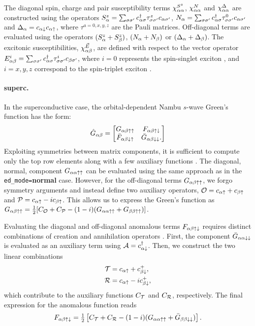 \documentclass[edipack_sp.tex]{subfiles}
\begin{document}
The diagonal spin, charge and pair susceptibility terms
$\chi^{S^z}_{\alpha\alpha}$, $\chi^N_{\alpha\alpha}$ and $\chi^\Delta_{\alpha\alpha}$
are constructed using the operators $S^z_\alpha = \sum_{\sigma\sigma'} c^\dagger_{\alpha\sigma}
\tau^z_{\sigma\sigma'} c_{\alpha\sigma'}$, 
$N_\alpha = \sum_{\sigma\sigma'} c^\dagger_{\alpha\sigma} \tau^0_{\sigma\sigma'} c_{\alpha\sigma'}$
and $\Delta_\alpha = c_{\alpha\downarrow}c_{\alpha\uparrow}$,
where $\tau^{a=0,x,y,z}$ are the Pauli matrices.
Off-diagonal terms are  evaluated using the operators
$(S^z_\alpha + S^z_\beta)$, $(N_\alpha + N_\beta)$ or $(\Delta_\alpha + \Delta_\beta)$. 
The excitonic susceptibilities, $\chi^{\vec{E}}_{\alpha\beta}$, are defined with 
respect to the vector operator $E^i_{\alpha\beta} = \sum_{\sigma\sigma'}
c^\dagger_{\alpha\sigma}\tau^i_{\sigma\sigma'}c_{\beta\sigma'}$, where $i=0$ represents the
spin-singlet exciton \cite{Giuli2023PRB}, and $i=x,y,z$  correspond to the spin-triplet exciton \cite{Amaricci2023PRB}.


\paragraph{{\bf superc}.}
In the superconductive case, the orbital-dependent Nambu $s$-wave
Green's function has the form:
\begin{equation}
  \label{GFnambu}
  \hat{G}_{\alpha\beta} =
  \begin{bmatrix}
    G_{\alpha\beta\uparrow\uparrow} & F_{\alpha\beta\uparrow\downarrow} \\
    \bar{F}_{\alpha\beta\downarrow\uparrow} & \bar{G}_{\alpha\beta\downarrow\downarrow}.
  \end{bmatrix}  
\end{equation}
Exploiting symmetries between matrix components, it is 
sufficient to compute only the top row elements along with 
a few auxiliary functions \cite{Capone2001PRL,Capone2002Science,Capone2004PRLsc,Toschi2005NJP,Toschi2005PRB,Capone2009RMP}.
%
The diagonal, normal, component $G_{\alpha\alpha\uparrow\uparrow}$ can be 
evaluated using the same approach as in the {\tt ed\_mode=}{\bf normal} 
case. However, for the off-diagonal terms $G_{\alpha\beta\uparrow\uparrow}$, 
we forgo symmetry arguments and instead define two 
auxiliary operators, ${\cal O} = c_{\alpha\uparrow} + c_{\beta\uparrow}$ and 
${\cal P} = c_{\alpha\uparrow} - i c_{\beta\uparrow}$. This allows us to express 
the Green's function as
$G_{\alpha\beta\uparrow\uparrow}=\tfrac{1}{2}[C_{\cal O} + C_{\cal P} -
(1-i)(G_{\alpha\alpha\uparrow\uparrow}+G_{\beta\beta\uparrow\uparrow})]$.

Evaluating the diagonal and off-diagonal anomalous terms 
$F_{\alpha\beta\uparrow\downarrow}$ requires distinct combinations of 
creation and annihilation operators \cite{Capone2001PRL,Capone2002Science,Capone2004PRLsc,Toschi2005NJP,Toschi2005PRB}. First, the component 
$\bar{G}_{\alpha\alpha\downarrow\downarrow}$ is evaluated as an auxiliary term 
using ${\cal A} = c^\dagger_{\alpha\downarrow}$. Then, we construct the two  
linear combinations
\begin{align*}
{\cal T} &= c_{\alpha\uparrow} + c^+_{\beta\downarrow}, \\
{\cal R} &= c_{\alpha\uparrow} - i c^+_{\beta\downarrow},
\end{align*}
which contribute to the auxiliary functions $C_{\cal T}$ and 
$C_{\cal R}$, respectively. The final expression for the 
anomalous function reads
\begin{equation}
F_{\alpha\beta\uparrow\downarrow} = \tfrac{1}{2} \left[ C_{\cal T} + C_{\cal R} - 
(1-i)(G_{\alpha\alpha\uparrow\uparrow} + \bar{G}_{\beta\beta\downarrow\downarrow}) \right].
\end{equation}
\end{document}
